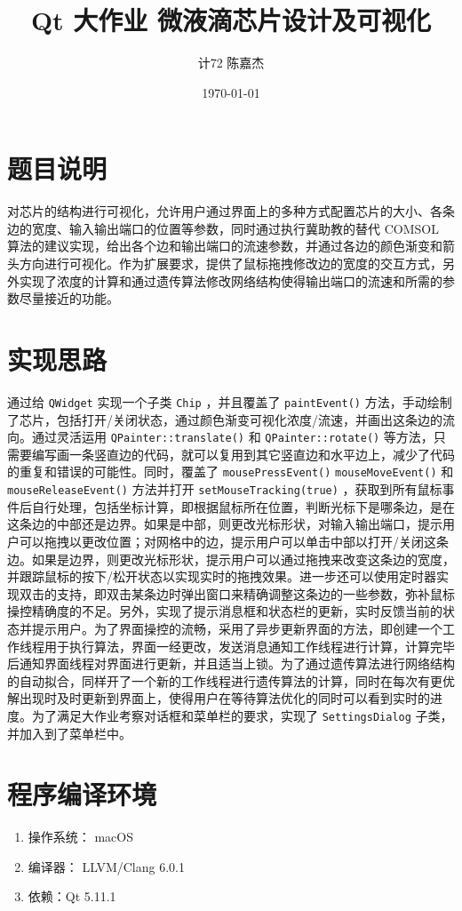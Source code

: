 \documentclass[11pt]{article}
\author{计72 陈嘉杰}
\date{\today}
\title{Qt 大作业 微液滴芯片设计及可视化}
\begin{document}
\maketitle
\tableofcontents

\section{题目说明}
\label{sec:orga711afd}
对芯片的结构进行可视化，允许用户通过界面上的多种方式配置芯片的大小、各条边的宽度、输入输出端口的位置等参数，同时通过执行冀助教的替代 COMSOL 算法的建议实现，给出各个边和输出端口的流速参数，并通过各边的颜色渐变和箭头方向进行可视化。作为扩展要求，提供了鼠标拖拽修改边的宽度的交互方式，另外实现了浓度的计算和通过遗传算法修改网络结构使得输出端口的流速和所需的参数尽量接近的功能。


\section{实现思路}
\label{sec:orgcfd05c0}
通过给 \texttt{QWidget} 实现一个子类 \texttt{Chip} ，并且覆盖了 \texttt{paintEvent()} 方法，手动绘制了芯片，包括打开/关闭状态，通过颜色渐变可视化浓度/流速，并画出这条边的流向。通过灵活运用 \texttt{QPainter::translate()} 和 \texttt{QPainter::rotate()} 等方法，只需要编写画一条竖直边的代码，就可以复用到其它竖直边和水平边上，减少了代码的重复和错误的可能性。同时，覆盖了 \texttt{mousePressEvent()} \texttt{mouseMoveEvent()} 和 \texttt{mouseReleaseEvent()} 方法并打开 \texttt{setMouseTracking(true)} ，获取到所有鼠标事件后自行处理，包括坐标计算，即根据鼠标所在位置，判断光标下是哪条边，是在这条边的中部还是边界。如果是中部，则更改光标形状，对输入输出端口，提示用户可以拖拽以更改位置；对网格中的边，提示用户可以单击中部以打开/关闭这条边。如果是边界，则更改光标形状，提示用户可以通过拖拽来改变这条边的宽度，并跟踪鼠标的按下/松开状态以实现实时的拖拽效果。进一步还可以使用定时器实现双击的支持，即双击某条边时弹出窗口来精确调整这条边的一些参数，弥补鼠标操控精确度的不足。另外，实现了提示消息框和状态栏的更新，实时反馈当前的状态并提示用户。为了界面操控的流畅，采用了异步更新界面的方法，即创建一个工作线程用于执行算法，界面一经更改，发送消息通知工作线程进行计算，计算完毕后通知界面线程对界面进行更新，并且适当上锁。为了通过遗传算法进行网络结构的自动拟合，同样开了一个新的工作线程进行遗传算法的计算，同时在每次有更优解出现时及时更新到界面上，使得用户在等待算法优化的同时可以看到实时的进度。为了满足大作业考察对话框和菜单栏的要求，实现了 \texttt{SettingsDialog} 子类，并加入到了菜单栏中。

\section{程序编译环境}
\label{sec:orgc4d79e2}
\begin{enumerate}
\item 操作系统： macOS
\item 编译器： LLVM/Clang 6.0.1
\item 依赖：Qt 5.11.1
\end{enumerate}
\end{document}
